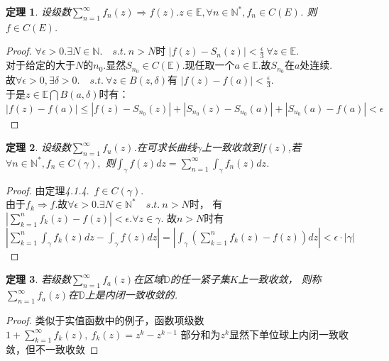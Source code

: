 \documentclass[b5paper,decoration]{qyxf-book}%
\newtheorem{mypro}{定理}[section]%
\begin{document}
\begin{mypro}
    设级数$\displaystyle{\sum\limits_{n=1}^\infty f_n(z)\Rightarrow f(z)}.z\in \mathbb{E},\forall n\in\mathbb{N}^*, f_n\in C(E)$.
    则$f\in C(E)$.
\end{mypro}
\begin{proof}
    $\forall\epsilon>0.\exists N\in\mathbb{N}.\quad s.t.\ n>N$时
    $\displaystyle{\left|f(z)-S_n(z)\right|<\frac{\epsilon}{3}\ \forall z\in\mathbb{E}}$.\\
    对于给定的大于$N$的$n_0$.显然$S_{n_0}\in C(\mathbb{E})$.现任取一个$a\in \mathbb{E}$.故$S_{n_0}$在$a$处连续.\\
    故$\forall\epsilon>0,\exists\delta>0.\quad s.t.\ \forall z\in B(z,\delta)$有
    $\displaystyle{\left|f(z)-f(a)\right|<\frac{\epsilon}{3}}$.\\
    于是$z\in\mathbb{E}\bigcap B(a,\delta)$时有：\\
    $\displaystyle{\left|f(z)-f(a)\right|\leq\left|f(z)-S_{n_0}(z)\right|
    +\left|S_{n_0}(z)-S_{u_0}(a)\right|+\left|S_{u_0}(a)-f(a)\right|<\epsilon}$
\end{proof}

\begin{mypro}
    设级数$\sum\limits_{n=1}^\infty f_u(z)$.在可求长曲线$\gamma$上一致收敛到$f(z)$,若$\forall n\in\mathbb{N}^*,f_n\in C(\gamma),$
    则$\displaystyle{\int_{\gamma}f(z)dz=\sum\limits_{n=1}^\infty\int_{\gamma}f_n(z)dz}$.
\end{mypro}
\begin{proof}
    由定理\emph{4.1.4}.\ $f\in C(\gamma)$.\\
    由于$f_k\Rightarrow f$.故$\forall\epsilon>0.\exists N\in\mathbb{N}^*\quad s.t.\ n>N$时，
    有$\displaystyle{\left|\sum\limits_{k=1}^nf_k(z)-f(z)\right|<\epsilon}.\forall z\in \gamma$.
    故$n>N$时有$\displaystyle{\left|\sum\limits_{k=1}^n\int_\gamma f_k(z)dz-\int_\gamma f(z)dz\right|
    =\left|\int_\gamma\left(\sum\limits_{k=1}^nf_k(z)-f(z)\right)dz\right|<\epsilon\cdot|\gamma|}$
\end{proof}

\begin{mypro}
    若级数$\displaystyle{\sum\limits_{n=1}^\infty f_a(z)}$在区域$\mathbb{D}$的任一紧子集$K$上一致收敛，
    则称$\displaystyle{\sum\limits_{n=1}^\infty f_a(z)}$在$\mathbb{D}$上是内闭一致收敛的.
\end{mypro}
\begin{proof}
    类似于实值函数中的例子，函数项级数$\displaystyle{1+\sum\limits_{k=1}^\infty f_k(z),\ f_k(z)=z^k-z^{k-1}}$
    部分和为$z^k$显然下单位球上内闭一致收敛，但不一致收敛
\end{proof}
\end{document}
